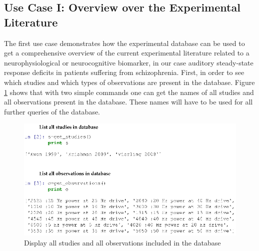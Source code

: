 \documentclass[a4paper,10pt]{article}
\begin{document}
% 
% 


\subsection{Use Case I: Overview over the Experimental Literature}
The first use case demonstrates how the experimental database can be used to get a comprehensive overview of the current experimental literature related to a neurophysiological or neurocognitive biomarker, in our case
auditory steady-state response deficits in patients suffering from schizophrenia. First, in order to see which studies and which types of observations are present in the database. Figure \ref{Fig:ListStudies} shows that with two
simple commands one can get the names of all studies and all observations present in the database. These names will have to be used for all further queries of the database.

\begin{figure}
\includegraphics[width=\textwidth]{Figures/list_studies_observations}
\caption{Display all studies  and all observations included in the database}
\label{Fig:ListStudies}
\end{figure}
\end{document}
